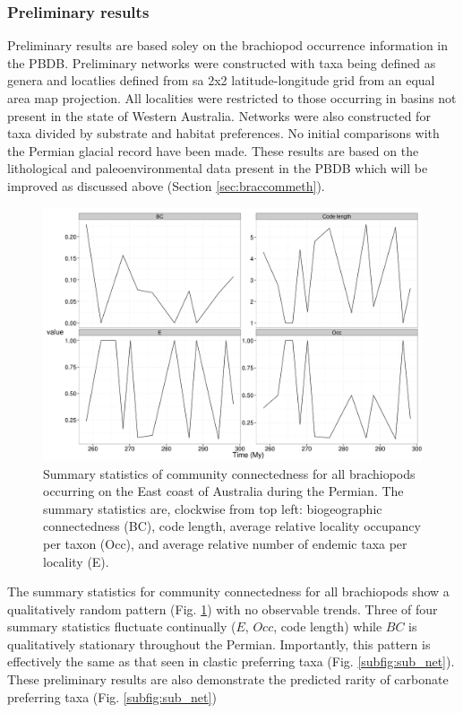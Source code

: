 \documentclass[12pt,letterpaper]{article}
\begin{document}
\subsubsection{Preliminary results} \label{sec:braccomres}
Preliminary results are based soley on the brachiopod occurrence information in the PBDB. Preliminary networks were constructed with taxa being defined as genera and locatlies defined from sa 2x2 latitude-longitude grid from an equal area map projection. All localities were restricted to those occurring in basins not present in the state of Western Australia. Networks were also constructed for taxa divided by substrate and habitat preferences. No initial comparisons with the Permian glacial record have been made. These results are based on the lithological and paleoenvironmental data present in the PBDB which will be improved as discussed above (Section \ref{sec:braccommeth}).

\begin{figure}[ht]
  \begin{center}
    \includegraphics[width = \textwidth, keepaspectratio = true]{figure/east_cast}
  \end{center}
  \caption[Community connectedness statistics for Australaian brachiopods]{Summary statistics of community connectedness for all brachiopods occurring on the East coast of Australia during the Permian. The summary statistics are, clockwise from top left: biogeographic connectedness (BC), code length, average relative locality occupancy per taxon (Occ), and average relative number of endemic taxa per locality (E).} 
  \label{fig:brac_net}
\end{figure}

The summary statistics for community connectedness for all brachiopods show a qualitatively random pattern (Fig. \ref{fig:brac_net}) with no observable trends. Three of four summary statistics fluctuate continually (\(E\), \(Occ\), code length) while \(BC\) is qualitatively stationary throughout the Permian. Importantly, this pattern is effectively the same as that seen in clastic preferring taxa (Fig. \ref{subfig:sub_net}). These preliminary results are also demonstrate the predicted rarity of carbonate preferring taxa (Fig. \ref{subfig:sub_net})
\end{document}
